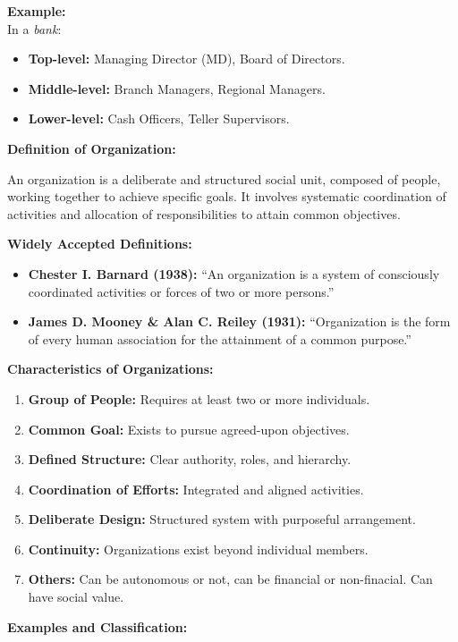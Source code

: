 \documentclass[10pt,a4paper]{book}
\begin{document}
\textbf{Example:}\\
In a \textit{bank}:
\begin{itemize}
    \item \textbf{Top-level:} Managing Director (MD), Board of Directors.
    \item \textbf{Middle-level:} Branch Managers, Regional Managers.
    \item \textbf{Lower-level:} Cash Officers, Teller Supervisors.
\end{itemize}


\textbf{Definition of Organization:}

An organization is a deliberate and structured social unit, composed of people, working together to achieve specific goals. It involves systematic coordination of activities and allocation of responsibilities to attain common objectives.

\textbf{Widely Accepted Definitions:}
\begin{itemize}
    \item \textbf{Chester I. Barnard (1938):} ``An organization is a system of consciously coordinated activities or forces of two or more persons.''
    \item \textbf{James D. Mooney \& Alan C. Reiley (1931):} ``Organization is the form of every human association for the attainment of a common purpose.''
\end{itemize}

\textbf{Characteristics of Organizations:}
\begin{enumerate}
    \item \textbf{Group of People:} Requires at least two or more individuals.
    \item \textbf{Common Goal:} Exists to pursue agreed-upon objectives.
    \item \textbf{Defined Structure:} Clear authority, roles, and hierarchy.
    \item \textbf{Coordination of Efforts:} Integrated and aligned activities.
    \item \textbf{Deliberate Design:} Structured system with purposeful arrangement.
    \item \textbf{Continuity:} Organizations exist beyond individual members.
    \item \textbf{Others:} Can be autonomous or not, can be financial or non-finacial. Can have social value.
\end{enumerate}

\textbf{Examples and Classification:}
\end{document}
